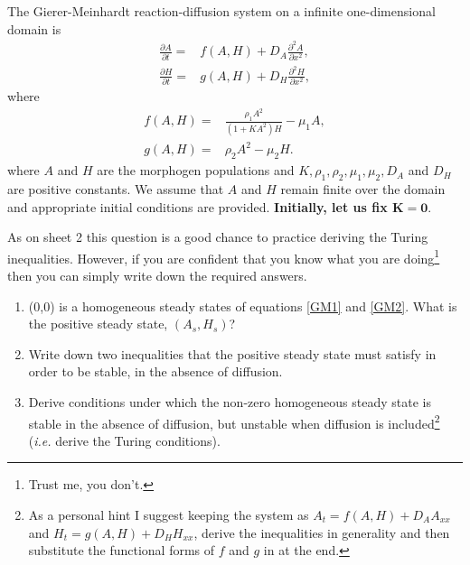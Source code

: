 \documentclass[10pt]{article}
\newcommand{\D}[2]{\frac{\partial #1}{\partial #2}}
\newcommand{\DD}[2]{\frac{\partial^2 #1}{\partial #2^2}}
\newcommand{\eqns}[2]{equations \eqref{#1} and \eqref{#2}}
\newcommand{\ie}{\emph{i.e.} }
\renewcommand{\l}{\left(}
\renewcommand{\r}{\right)}
\newcounter{Counter1}
\begin{document}
The Gierer-Meinhardt reaction-diffusion system on a infinite one-dimensional domain is
\begin{align}
\D{A}{t}=&f(A,H)+ D_A \DD{A}{x},\label{GM1}\\
\D{H}{t}=&g(A,H)+ D_H \DD{H}{x},\label{GM2}
\end{align}
where
\begin{align}
f(A,H)=&\frac{\rho_1 A^2}{\l 1+KA^2\r H}-\mu_1 A,\\
g(A,H)=&\rho_2 A^2-\mu_2 H.
\end{align}
where $A$ and $H$ are the morphogen populations and $K, \rho_1, \rho_2, \mu_1, \mu_2, D_A$ and $D_H$ are positive constants. We assume that $A$ and $H$ remain finite over the domain and appropriate initial conditions are provided. \textbf{Initially, let us fix $\bm{K=0}$}.

As on sheet 2 this question is a good chance to practice deriving the Turing inequalities. However, if you are confident that you know what you are doing\footnote{Trust me, you don't.} then you can simply write down the required answers.
\begin{enumerate}
\item (0,0) is a homogeneous steady states of \eqns{GM1}{GM2}. What is the positive steady state, $(A_s,H_s)$?


\item Write down two inequalities that the positive steady state must satisfy in order to be stable, in the absence of diffusion.


\item Derive conditions under which the non-zero homogeneous steady state is stable in the absence of diffusion, but unstable when diffusion is included\footnote{As a personal hint I suggest keeping the system as $A_t=f(A,H)+D_A A_{xx}$ and $H_t=g(A,H)+D_H H_{xx}$, derive the inequalities in generality and then substitute the functional forms of $f$ and $g$ in at the end.} (\ie derive the Turing conditions).\label{Turing}


\setcounter{Counter1}{\value{enumi}}
\end{enumerate}
\end{document}
